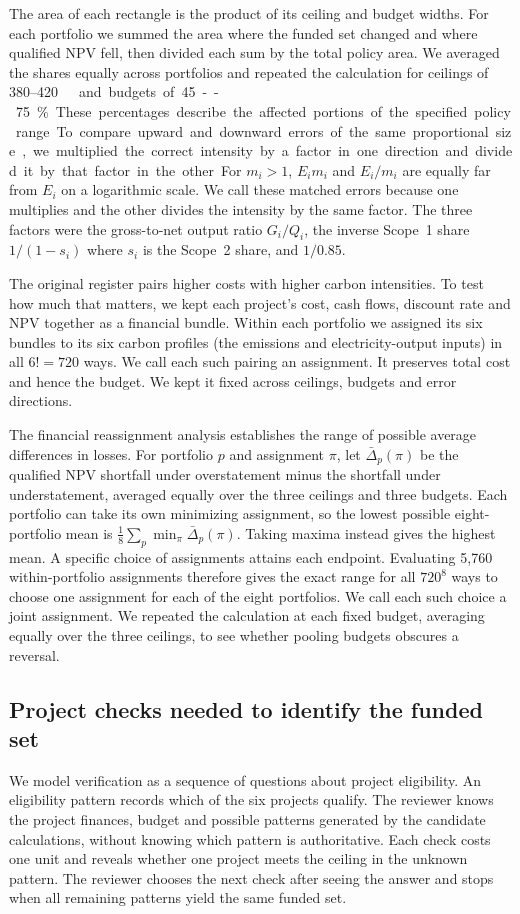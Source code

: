 The area of each rectangle is the product of its ceiling and budget widths. For each portfolio we summed the area where the funded set changed and where qualified NPV fell, then divided each sum by the total policy area. We averaged the shares equally across portfolios and repeated the calculation for ceilings of 380--420~\unit\ and budgets of 45--75\%. These percentages describe the affected portions of the specified policy range.

To compare upward and downward errors of the same proportional size, we multiplied the correct intensity by a factor in one direction and divided it by that factor in the other. For $m_i>1$, $E_i m_i$ and $E_i/m_i$ are equally far from $E_i$ on a logarithmic scale. We call these matched errors because one multiplies and the other divides the intensity by the same factor. The three factors were the gross-to-net output ratio $G_i/Q_i$, the inverse Scope~1 share $1/(1-s_i)$ where $s_i$ is the Scope~2 share, and $1/0.85$.

The original register pairs higher costs with higher carbon intensities. To test how much that matters, we kept each project's cost, cash flows, discount rate and NPV together as a financial bundle. Within each portfolio we assigned its six bundles to its six carbon profiles (the emissions and electricity-output inputs) in all $6!=720$ ways. We call each such pairing an assignment. It preserves total cost and hence the budget. We kept it fixed across ceilings, budgets and error directions.

The financial reassignment analysis establishes the range of possible average differences in losses. For portfolio $p$ and assignment $\pi$, let $\bar\Delta_p(\pi)$ be the qualified NPV shortfall under overstatement minus the shortfall under understatement, averaged equally over the three ceilings and three budgets. Each portfolio can take its own minimizing assignment, so the lowest possible eight-portfolio mean is $\tfrac18\sum_p\min_\pi\bar\Delta_p(\pi)$. Taking maxima instead gives the highest mean. A specific choice of assignments attains each endpoint. Evaluating 5,760 within-portfolio assignments therefore gives the exact range for all $720^8$ ways to choose one assignment for each of the eight portfolios. We call each such choice a joint assignment. We repeated the calculation at each fixed budget, averaging equally over the three ceilings, to see whether pooling budgets obscures a reversal.

\subsection{Project checks needed to identify the funded set}
We model verification as a sequence of questions about project eligibility. An eligibility pattern records which of the six projects qualify. The reviewer knows the project finances, budget and possible patterns generated by the candidate calculations, without knowing which pattern is authoritative. Each check costs one unit and reveals whether one project meets the ceiling in the unknown pattern. The reviewer chooses the next check after seeing the answer and stops when all remaining patterns yield the same funded set.

